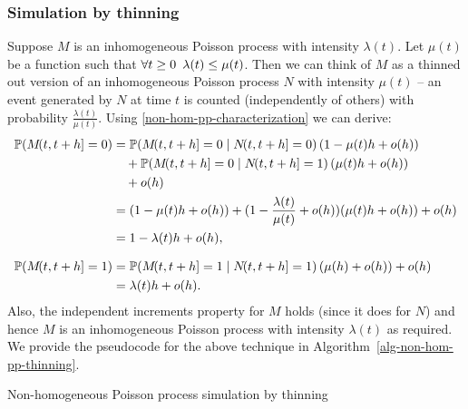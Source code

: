 \documentclass[report.tex]{subfiles}
\begin{document}
\subsubsection{Simulation by thinning}

Suppose $M$ is an inhomogeneous Poisson process with intensity $\lambda(t)$.
Let $\mu(t)$ be a function such that
$\forall t \geq 0 \enskip \lambda(t) \leq \mu(t)$. Then we can think of
$M$ as a thinned out version of an inhomogeneous Poisson process $N$ with
intensity $\mu(t)$ --
an event generated by $N$ at time $t$ is counted (independently of others)
with probability $\frac{\lambda(t)}{\mu(t)}$.
Using \ref{non-hom-pp-characterization} we can derive:
\begin{equation*}
\begin{split}
\pr{\countingProcess{M}{t}{t+h} = 0}
&= \cpr{\countingProcess{M}{t}{t+h} = 0}{\countingProcess{N}{t}{t+h} = 0}
   (1 - \mu(t)h + o(h)) \\
   &\quad+ \cpr{\countingProcess{M}{t}{t+h} = 0}{\countingProcess{N}{t}{t+h} = 1}
   (\mu(t)h + o(h)) \\
   &\quad+ o(h) \\
&= (1 - \mu(t)h + o(h)) + (1 - \frac{\lambda(t)}{\mu(t)} + o(h))
   (\mu(t)h + o(h)) + o(h) \\
   &= 1 - \lambda(t)h + o(h), \\[0.75em]
\pr{\countingProcess{M}{t}{t+h} = 1}
&= \cpr{\countingProcess{M}{t}{t+h} = 1}{\countingProcess{N}{t}{t+h} = 1}
   (\mu(h) + o(h)) + o(h) \\
&= \lambda(t)h + o(h).
\end{split}
\end{equation*}
Also, the independent increments property for $M$ holds (since it does for $N$) and
hence $M$ is an inhomogeneous Poisson process with intensity $\lambda(t)$ as required.
We provide the pseudocode for the above technique in
Algorithm~\ref{alg-non-hom-pp-thinning}.

\begin{algorithm}
\caption{Non-homogeneous Poisson process simulation by thinning}
\label{alg-non-hom-pp-thinning}
\begin{algorithmic}
    \EndWhile
  \EndFor
\end{algorithmic}
\end{algorithm}
\end{document}
